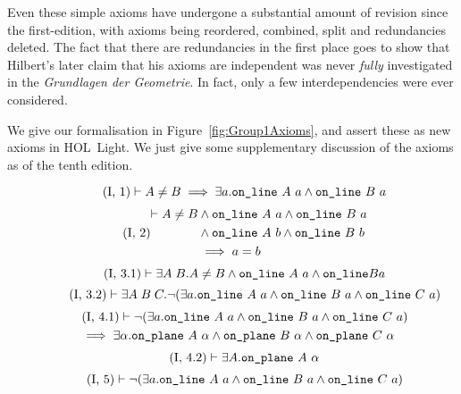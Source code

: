 Even these simple axioms have undergone a substantial amount of revision since the first-edition, with axioms being reordered, combined, split and redundancies deleted. The fact that there are redundancies in the first place goes to show that Hilbert's later claim that his axioms are independent was never \emph{fully} investigated in the \emph{Grundlagen der Geometrie}. In fact, only a few interdependencies were ever considered.

We give our formalisation in Figure~\ref{fig:Group1Axioms}, and assert these as new axioms in HOL~Light. We just give some supplementary discussion of the axioms as of the tenth edition.

\begin{figure}
\begin{equation}\label{eq:g11}
  \tag{I,~1}
    \vdash A \neq B \implies \exists a. \texttt{on\_line}\ A\ a \wedge \texttt{on\_line}\ B\ a
\end{equation}
\begin{equation}\label{eq:g12}
  \tag{I,~2}
  \begin{split}
    \vdash A \neq B &\wedge \texttt{on\_line}\ A\ a \wedge \texttt{on\_line}\ B\ a\\
    &\wedge \texttt{on\_line}\ A\ b \wedge \texttt{on\_line}\ B\ b\\
    &\implies a = b
  \end{split}
\end{equation}
\begin{equation}\label{eq:g13a}
  \tag{I,~3.1}
  \vdash \exists A\; B. A \neq B \wedge \texttt{on\_line}\ A\ a \wedge \texttt{on\_line} B a
\end{equation}
\begin{equation}\label{eq:g13b}  \tag{I,~3.2}
  \vdash\exists A\; B\; C. \neg(\exists a.\texttt{on\_line}\ A\ a\wedge \texttt{on\_line}\ B\ a\wedge \texttt{on\_line}\ C\ a)
\end{equation}
\begin{multline}\label{eq:g14a}
  \tag{I,~4.1}
  \vdash\neg(\exists a.\texttt{on\_line}\ A\ a\wedge \texttt{on\_line}\ B\ a\wedge \texttt{on\_line}\ C\ a)\\\quad \implies \exists \alpha. \texttt{on\_plane}\ A\ \alpha \wedge \texttt{on\_plane}\ B\ \alpha \wedge \texttt{on\_plane}\ C\ \alpha
\end{multline}
\begin{equation}\label{eq:g14b}
  \tag{I,~4.2}
  \vdash\exists A. \texttt{on\_plane}\ A\ \alpha
\end{equation}
\begin{equation}\label{eq:g15}
  \tag{I,~5}
  \begin{split}
    &\vdash\Triangle{a}{A}{B}{C}\\

\end{split}
\end{equation}
\end{figure}
